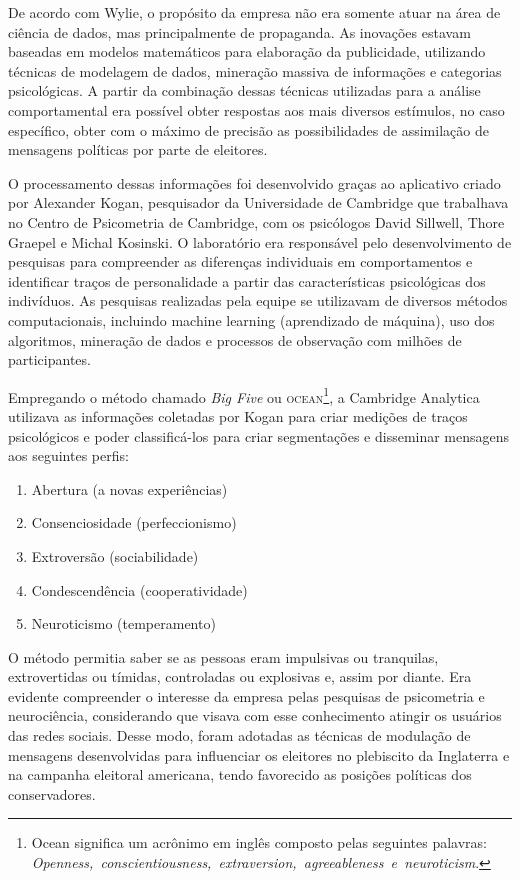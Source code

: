 De acordo com Wylie, o propósito da empresa não era somente atuar na
área de ciência de dados, mas principalmente de propaganda. As inovações
estavam baseadas em modelos matemáticos para elaboração da publicidade,
utilizando técnicas de modelagem de dados, mineração massiva de
informações e categorias psicológicas. A partir da combinação dessas
técnicas utilizadas para a análise comportamental era possível obter
respostas aos mais diversos estímulos, no caso específico, obter com o
máximo de precisão as possibilidades de assimilação de mensagens
políticas por parte de eleitores.

O processamento dessas informações foi desenvolvido graças ao aplicativo
criado por Alexander Kogan, pesquisador da Universidade de Cambridge que
trabalhava no Centro de Psicometria de Cambridge, com os psicólogos
David Sillwell, Thore Graepel e Michal Kosinski. O laboratório era
responsável pelo desenvolvimento de pesquisas para compreender as
diferenças individuais em comportamentos e identificar traços de
personalidade a partir das características psicológicas dos indivíduos.
As pesquisas realizadas pela equipe se utilizavam de diversos métodos
computacionais, incluindo machine learning (aprendizado de máquina), uso
dos algoritmos, mineração de dados e processos de observação com milhões
de participantes.

Empregando o método chamado \textit{Big Five} ou \textsc{ocean}\footnote{Ocean
  significa um acrônimo em inglês composto pelas seguintes palavras: \textit{Openness,~conscientiousness,~extraversion,~agreeableness~e~neuroticism}.},
a Cambridge Analytica utilizava as informações coletadas por Kogan para
criar medições de traços psicológicos e poder classificá-los para criar segmentações e disseminar mensagens aos seguintes perfis:

\begin{enumerate}
\item Abertura (a novas experiências)
\item Consenciosidade (perfeccionismo)
\item Extroversão (sociabilidade)
\item Condescendência (cooperatividade)
\item Neuroticismo (temperamento)
\end{enumerate}

O método permitia saber se as pessoas eram impulsivas ou tranquilas,
extrovertidas ou tímidas, controladas ou explosivas e, assim por diante.
Era evidente compreender o interesse da empresa pelas pesquisas de
psicometria e neurociência, considerando que visava com esse
conhecimento atingir os usuários das redes sociais. Desse modo, foram
adotadas as técnicas de modulação de mensagens desenvolvidas para
influenciar os eleitores no plebiscito da Inglaterra e na campanha
eleitoral americana, tendo favorecido as posições políticas dos
conservadores.

